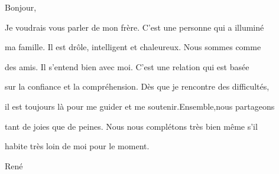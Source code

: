 \documentclass{article}
\begin{document}
Bonjour,\par
Je voudrais vous parler de mon frère. C'est une personne qui a illuminé \par
ma famille. Il est drôle, intelligent et chaleureux. Nous sommes comme \par
des amis. Il s'entend bien avec moi. C'est une relation qui est basée \par
sur la confiance et la compréhension. Dès que je rencontre des difficultés, \par
il est toujours là pour me guider et me soutenir.Ensemble,nous partageons\par
tant de joies que de peines. Nous nous complétons très bien même s'il \par
habite très loin de moi pour le moment.\par
René
\end{document}
